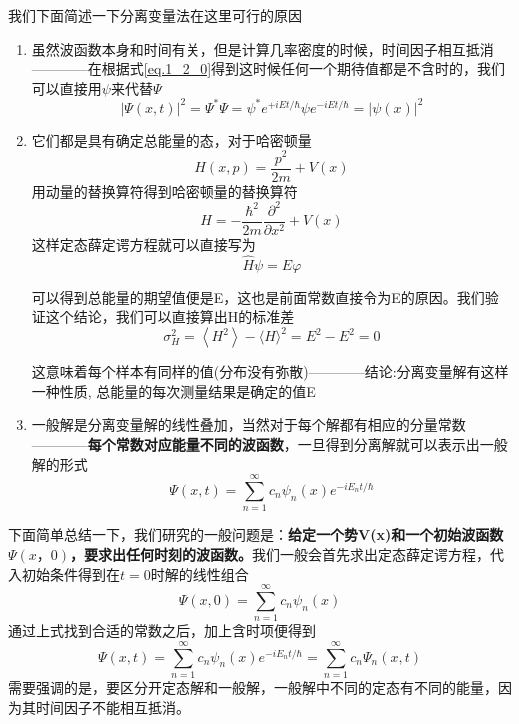 	我们下面简述一下分离变量法在这里可行的原因
	\begin{enumerate}
	\item 虽然波函数本身和时间有关，但是计算几率密度的时候，时间因子相互抵消————在根据式\ref{eq.1_2_0}得到这时候任何一个期待值都是不含时的，我们可以直接用$\psi$来代替$\Psi$
		\begin{equation}
		|\Psi(x, t)|^{2}=\Psi^{*} \Psi=\psi^{*} e^{+i E t / \hbar} \psi e^{-i E t / \hbar}=|\psi(x)|^{2}
		\end{equation}
	\item 它们都是具有确定总能量的态，对于哈密顿量
		\begin{equation}
		H(x, p)=\frac{p^{2}}{2 m}+V(x)
		\end{equation}
	用动量的替换算符得到哈密顿量的替换算符
		\begin{equation}
		\hat{H}=-\frac{\hbar^{2}}{2 m} \frac{\partial^{2}}{\partial x^{2}}+V(x)
		\end{equation}
	这样定态薛定谔方程就可以直接写为
		\begin{equation}
		\hat{H} \psi=E \varphi
		\end{equation}
	
	\qquad 可以得到总能量的期望值便是E，这也是前面常数直接令为E的原因。我们验证这个结论，我们可以直接算出H的标准差
		\begin{equation}
		\sigma_{H}^{2}=\left\langle H^{2}\right\rangle-\langle H\rangle^{2}=E^{2}-E^{2}=0
		\end{equation}
	
	\qquad 这意味着每个样本有同样的值(分布没有弥散)————结论:分离变量解有这样一种性质, 总能量的每次测量结果是确定的值E
	\item 一般解是分离变量解的线性叠加，当然对于每个解都有相应的分量常数————\textbf{每个常数对应能量不同的波函数}，一旦得到分离解就可以表示出一般解的形式
		\begin{equation}
		\Psi(x, t)=\sum_{n=1}^{\infty} c_{n} \psi_{n}(x) e^{-i E_{n} t / \hbar}
		\end{equation}
	\end{enumerate}

	下面简单总结一下，我们研究的一般问题是：\textbf{给定一个势V(x)和一个初始波函数$\Psi(x，0)$，要求出任何时刻的波函数。}我们一般会首先求出定态薛定谔方程，代入初始条件得到在$t=0$时解的线性组合
		\begin{equation}
		\Psi(x, 0)=\sum_{n=1}^{\infty} c_{n} \psi_{n}(x)
		\end{equation}
	通过上式找到合适的常数之后，加上含时项便得到
	\begin{equation}
	\label{eq.2_1_3}
	\boxed{\Psi(x, t)=\sum_{n=1}^{\infty} c_{n} \psi_{n}(x) e^{-i E_{n} t / \hbar}=\sum_{n=1}^{\infty} c_{n} \Psi_{n}(x, t)}
	\end{equation}
	需要强调的是，要区分开定态解和一般解，一般解中不同的定态有不同的能量，因为其时间因子不能相互抵消。
